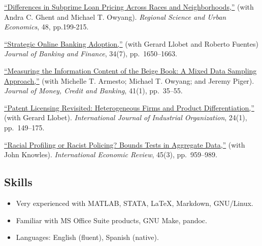 \documentclass[10pt,]{article}
\begin{document}
\begin{description}
\itemsep1pt\parskip0pt
\item[2014]
\href{http://dx.doi.org/10.1016/j.regsciurbeco.2014.07.006}{``Differences
in Subprime Loan Pricing Across Races and Neighborhoods,''} (with Andra
C. Ghent and Michael T. Owyang). \emph{Regional Science and Urban
Economics}, 48, pp.199-215.
\item[2010]
\href{http://dx.doi.org/10.1016/j.jbankfin.2010.03.011}{``Strategic
Online Banking Adoption,''} (with Gerard Llobet and Roberto Fuentes)
\emph{Journal of Banking and Finance}, 34(7), pp.~1650--1663.
\item[2009]
\href{http://dx.doi.org/10.1111/j.1538-4616.2008.00186.x}{``Measuring
the Information Content of the Beige Book: A Mixed Data Sampling
Approach,''} (with Michelle T. Armesto; Michael T. Owyang; and Jeremy
Piger). \emph{Journal of Money, Credit and Banking}, 41(1), pp.~35--55.
\item[2006]
\href{http://dx.doi.org/10.1016/j.ijindorg.2005.03.008}{``Patent
Licensing Revisited: Heterogeneous Firms and Product Differentiation,''}
(with Gerard Llobet). \emph{International Journal of Industrial
Organization}, 24(1), pp.~149--175.
\item[2004]
\href{http://dx.doi.org/10.1111/j.0020-6598.2004.00293.x}{``Racial
Profiling or Racist Policing? Bounds Tests in Aggregate Data,''} (with
John Knowles). \emph{International Economic Review}, 45(3),
pp.~959--989.
\end{description}

\subsection{Skills}\label{skills}

\begin{itemize}
\itemsep1pt\parskip0pt
\item
  Very experienced with MATLAB, STATA, \LaTeX, Markdown, GNU/Linux.
\item
  Familiar with MS Office Suite products, GNU Make, pandoc.
\item
  Languages: English (fluent), Spanish (native).
\end{itemize}
\end{document}

